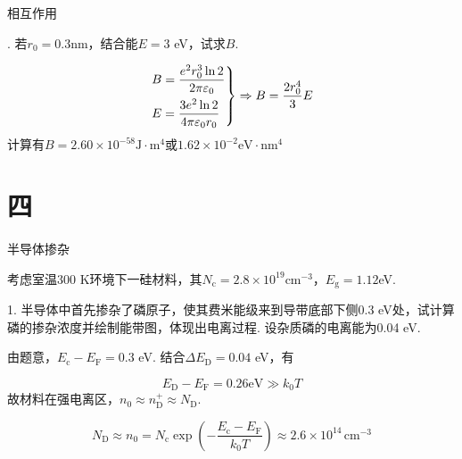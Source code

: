 \documentclass{beamer}
\begin{document}
\begin{frame}[t]{相互作用}

    {. 若$r_0=0.3$nm，结合能$E=3$ eV，试求$B$.\par
    }
    \vspace{-0.1cm}

    \begin{equation*}
        \begin{rcases}
            B = \dfrac{e^{2}r_0^3 \ln 2}{2 \pi \varepsilon_{0} } \\
            E = \dfrac{3e^{2} \ln 2}{4 \pi \varepsilon_{0} r_0}
        \end{rcases}
        \Rightarrow B = \dfrac{2r_0^4}{3}E
    \end{equation*}
    计算有$B=2.60\times 10^{-58}\text{J}\cdot\text{m}^4$或$1.62\times 10^{-2} \text{eV}\cdot \text{nm}^4$
    
\end{frame}

\section{四}
\begin{frame}[t]{半导体掺杂}

    {\kaishu
        \qquad 考虑室温300 K环境下一硅材料，其$N_{\text{c}}=2.8\times 10^{19}$cm$^{-3}$，$E_\text{{g}} = 1.12$eV.\par
        1. 半导体中首先掺杂了磷原子，使其费米能级来到导带底部下侧0.3 eV处，试计算磷的掺杂浓度并绘制能带图，体现出电离过程. 设杂质磷的电离能为0.04 eV.\par
    }
    \vspace{0.1cm}
    \qquad 由题意，$E_{\text{c}}-E_{\text{F}}=0.3$ eV. 结合$\Delta E_\text{D}=0.04$ eV，有\par
    \vspace{-0.3cm}
    \[
        E_{\text{D}}-E_{\text{F}}=0.26\text{eV} \gg k_0 T
    \]
    故材料在强电离区，$n_0 \approx n_{\text{D}}^+ \approx N_{\text{D}}$.\par
    \vspace{-0.1cm}
    \[
        N_{\text{D}}\approx n_0 = N_{\text{c}} \exp ( - \frac{E_{\text{c}}-E_{\text{F}}}{k_0 T} ) \approx 2.6\times 10^{14} \, \text{cm}^{-3}  
    \]
\end{frame}
\end{document}
